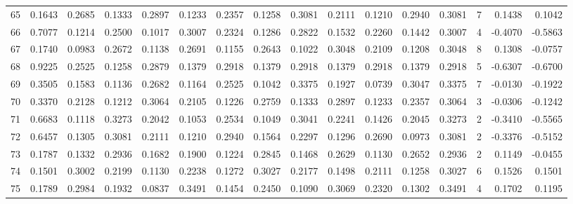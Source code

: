 \begin{tabular}{lrrrrrrrrrrrrrrr}
65  &      0.1643 &  0.2685 &  0.1333 &  0.2897 &  0.1233 &  0.2357 &  0.1258 &  0.3081 &  0.2111 &  0.1210 &   0.2940 &     0.3081 &      7 &                    0.1438 &                     0.1042 \\
66  &      0.7077 &  0.1214 &  0.2500 &  0.1017 &  0.3007 &  0.2324 &  0.1286 &  0.2822 &  0.1532 &  0.2260 &   0.1442 &     0.3007 &      4 &                   -0.4070 &                    -0.5863 \\
67  &      0.1740 &  0.0983 &  0.2672 &  0.1138 &  0.2691 &  0.1155 &  0.2643 &  0.1022 &  0.3048 &  0.2109 &   0.1208 &     0.3048 &      8 &                    0.1308 &                    -0.0757 \\
68  &      0.9225 &  0.2525 &  0.1258 &  0.2879 &  0.1379 &  0.2918 &  0.1379 &  0.2918 &  0.1379 &  0.2918 &   0.1379 &     0.2918 &      5 &                   -0.6307 &                    -0.6700 \\
69  &      0.3505 &  0.1583 &  0.1136 &  0.2682 &  0.1164 &  0.2525 &  0.1042 &  0.3375 &  0.1927 &  0.0739 &   0.3047 &     0.3375 &      7 &                   -0.0130 &                    -0.1922 \\
70  &      0.3370 &  0.2128 &  0.1212 &  0.3064 &  0.2105 &  0.1226 &  0.2759 &  0.1333 &  0.2897 &  0.1233 &   0.2357 &     0.3064 &      3 &                   -0.0306 &                    -0.1242 \\
71  &      0.6683 &  0.1118 &  0.3273 &  0.2042 &  0.1053 &  0.2534 &  0.1049 &  0.3041 &  0.2241 &  0.1426 &   0.2045 &     0.3273 &      2 &                   -0.3410 &                    -0.5565 \\
72  &      0.6457 &  0.1305 &  0.3081 &  0.2111 &  0.1210 &  0.2940 &  0.1564 &  0.2297 &  0.1296 &  0.2690 &   0.0973 &     0.3081 &      2 &                   -0.3376 &                    -0.5152 \\
73  &      0.1787 &  0.1332 &  0.2936 &  0.1682 &  0.1900 &  0.1224 &  0.2845 &  0.1468 &  0.2629 &  0.1130 &   0.2652 &     0.2936 &      2 &                    0.1149 &                    -0.0455 \\
74  &      0.1501 &  0.3002 &  0.2199 &  0.1130 &  0.2238 &  0.1272 &  0.3027 &  0.2177 &  0.1498 &  0.2111 &   0.1258 &     0.3027 &      6 &                    0.1526 &                     0.1501 \\
75  &      0.1789 &  0.2984 &  0.1932 &  0.0837 &  0.3491 &  0.1454 &  0.2450 &  0.1090 &  0.3069 &  0.2320 &   0.1302 &     0.3491 &      4 &                    0.1702 &                     0.1195 \\

\end{tabular}
